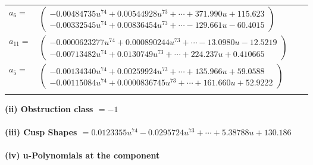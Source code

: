 \documentclass[1p]{elsarticle_modified}
\theoremstyle{definition}
\begin{document}
\begin{tabular}{m{7pt} m{180pt} m{7pt} m{180pt} }
\flushright $a_{6}=$&$\begin{pmatrix}-0.00484735 u^{74}+0.00544928 u^{73}+\cdots+371.990 u+115.623\\-0.00332545 u^{74}+0.00836454 u^{73}+\cdots-129.661 u-60.4015\end{pmatrix}$ \\
\flushright $a_{11}=$&$\begin{pmatrix}-0.0000623277 u^{74}+0.000890244 u^{73}+\cdots-13.0980 u-12.5219\\-0.00713482 u^{74}+0.0130749 u^{73}+\cdots+224.237 u+0.410665\end{pmatrix}$ \\
\flushright $a_{5}=$&$\begin{pmatrix}-0.00134340 u^{74}+0.00259924 u^{73}+\cdots+135.966 u+59.0588\\-0.00115084 u^{74}+0.0000836745 u^{73}+\cdots+161.660 u+52.9222\end{pmatrix}$\\&\end{tabular}
\flushleft \textbf{(ii) Obstruction class $= -1$}\\~\\
\flushleft \textbf{(iii) Cusp Shapes $= 0.0123355 u^{74}-0.0295724 u^{73}+\cdots+5.38788 u+130.186$}\\~\\
\newpage\renewcommand{\arraystretch}{1}
\flushleft \textbf{(iv) u-Polynomials at the component}\newline \\
\end{document}
